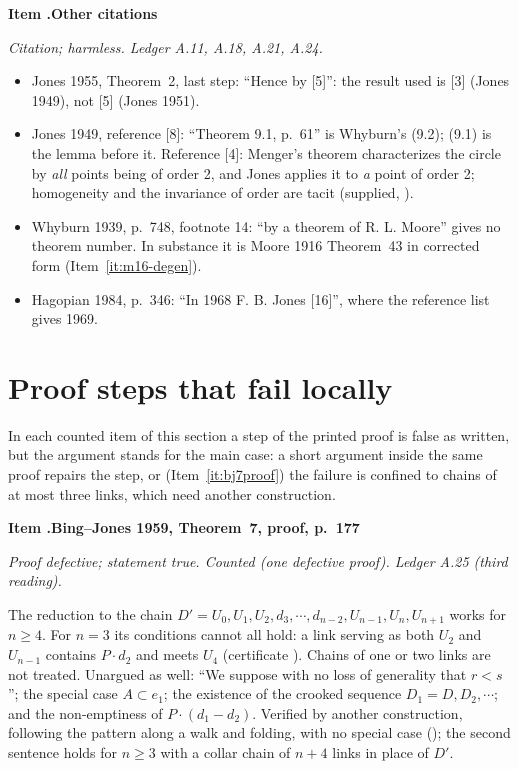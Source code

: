 \documentclass[11pt]{article}
\newcounter{defect}
\newenvironment{defect}[4]{%
  \par\addvspace{10pt}\refstepcounter{defect}%
  \noindent\textbf{Item \thedefect.\enspace #1}\par\nopagebreak
  \noindent\textit{#2}\par\nopagebreak\smallskip}{\par\addvspace{6pt}}
\begin{document}
\begin{defect}{Other citations}{Citation; harmless. Ledger A.11, A.18, A.21, A.24.}{0}{0}\label{it:cite-misc}
\begin{itemize}
\item Jones 1955, Theorem~2, last step: ``Hence by [5]'': the result used is [3] (Jones 1949), not
  [5] (Jones 1951).
\item Jones 1949, reference [8]: ``Theorem 9.1, p.~61'' is Whyburn's (9.2); (9.1) is the lemma
  before it. Reference [4]: Menger's theorem characterizes the circle by \emph{all} points being
  of order 2, and Jones applies it to \emph{a} point of order 2; homogeneity and the invariance of
  order are tacit (supplied, ).
\item Whyburn 1939, p.~748, footnote 14: ``by a theorem of R. L. Moore'' gives no theorem number. In
  substance it is Moore 1916 Theorem~43 in corrected form (Item~\ref{it:m16-degen}).
\item Hagopian 1984, p.~346: ``In 1968 F. B. Jones [16]'', where the reference list gives 1969.
\end{itemize}
\end{defect}

\section{Proof steps that fail locally}\label{sec:local}

In each counted item of this section a step of the printed proof is false as written, but the
argument stands for the main case: a short argument inside the same proof repairs the step, or
(Item~\ref{it:bj7proof}) the failure is confined to chains of at most three links, which need
another construction.

\begin{defect}{Bing--Jones 1959, Theorem~7, proof, p.~177}{Proof defective; statement true. Counted
(one defective proof). Ledger A.25 (third reading).}{0}{1}\label{it:bj7proof}
The reduction to the chain $D'=U_0,U_1,U_2,d_3,\cdots,d_{n-2},U_{n-1},U_n,U_{n+1}$ works for $n\ge4$.
For $n=3$ its conditions cannot all hold: a link serving as both $U_2$ and $U_{n-1}$ contains
$P\cdot d_2$ and meets $U_4$ (certificate ). Chains of one or two links
are not treated. Unargued as well: ``We suppose with no loss of generality that $r<s$''; the
special case $A\subset e_1$; the existence of the crooked sequence $D_1=D,D_2,\cdots$; and the
non-emptiness of $P\cdot(d_1-d_2)$. Verified by another construction, following the pattern along
a walk and folding, with no special case (); the second sentence holds for
$n\ge3$ with a collar chain of $n+4$ links in place of $D'$.
\end{defect}
\end{document}
